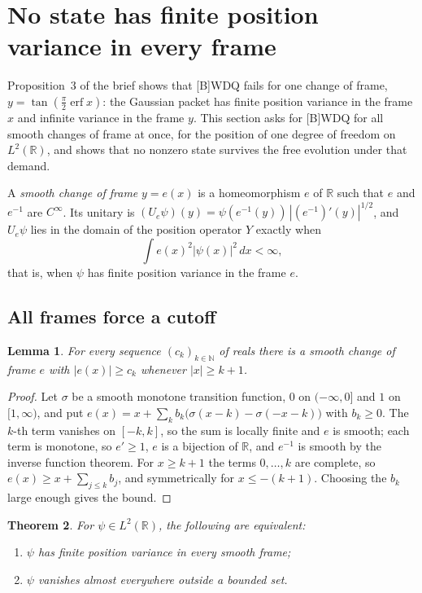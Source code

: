 \documentclass[11pt]{article}
\newtheorem{theorem}{Theorem}[section]
\newtheorem{lemma}[theorem]{Lemma}
\theoremstyle{remark}
\begin{document}
\section{No state has finite position variance in every frame}
\label{sec:frames}

Proposition~3 of the brief shows that [B]WDQ fails for one change of frame,
$y = \tan(\frac\pi2\operatorname{erf}x)$: the Gaussian packet has finite position variance in
the frame $x$ and infinite variance in the frame $y$. This section asks for [B]WDQ for all smooth
changes of frame at once, for the position of one degree of freedom on $L^2(\mathbb R)$, and
shows that no nonzero state survives the free evolution under that demand.

A \emph{smooth change of frame} $y = e(x)$ is a homeomorphism $e$ of $\mathbb R$ such that $e$
and $e^{-1}$ are $C^\infty$. Its unitary is $(U_e\psi)(y) = \psi(e^{-1}(y))\,|(e^{-1})'(y)|^{1/2}$,
and $U_e\psi$ lies in the domain of the position operator $Y$ exactly when
\[
  \int e(x)^2 |\psi(x)|^2 \,dx < \infty,
\]
that is, when $\psi$ has finite position variance in the frame $e$.

\subsection{All frames force a cutoff}

\begin{lemma}\label{lem:staircase}
  For every sequence $(c_k)_{k\in\mathbb N}$ of reals there is a smooth change of frame $e$ with
  $|e(x)| \ge c_k$ whenever $|x| \ge k+1$.
\end{lemma}

\begin{proof}
  Let $\sigma$ be a smooth monotone transition function, $0$ on $(-\infty,0]$ and $1$ on
  $[1,\infty)$, and put $e(x) = x + \sum_k b_k\bigl(\sigma(x-k) - \sigma(-x-k)\bigr)$ with
  $b_k \ge 0$. The $k$-th term vanishes on $[-k,k]$, so the sum is locally finite and $e$ is
  smooth; each term is monotone, so $e' \ge 1$, $e$ is a bijection of $\mathbb R$, and $e^{-1}$
  is smooth by the inverse function theorem. For $x \ge k+1$ the terms $0,\dots,k$ are complete,
  so $e(x) \ge x + \sum_{j\le k} b_j$, and symmetrically for $x \le -(k+1)$. Choosing the $b_k$
  large enough gives the bound.
\end{proof}

\begin{theorem}\label{thm:cutoff}
  For $\psi \in L^2(\mathbb R)$, the following are equivalent:
  \begin{enumerate}
    \item $\psi$ has finite position variance in every smooth frame;
    \item $\psi$ vanishes almost everywhere outside a bounded set.
  \end{enumerate}
\end{theorem}
\end{document}
